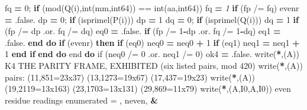 \documentclass[10pt]{article}
\renewcommand{\_}{\origunderscore\allowbreak}
\newenvironment{Shaded}{}{}
\newcommand{\BuiltInTok}[1]{#1}
\newcommand{\CommentTok}[1]{\textit{#1}}
\newcommand{\ConstantTok}[1]{#1}
\newcommand{\DecValTok}[1]{#1}
\newcommand{\KeywordTok}[1]{\textbf{#1}}
\newcommand{\NormalTok}[1]{#1}
\newcommand{\OperatorTok}[1]{#1}
\newcommand{\StringTok}[1]{#1}
\begin{document}
\begin{Shaded}
\begin{Highlighting}[]
\NormalTok{              fq }\KeywordTok{=} \DecValTok{0}\NormalTok{; }\KeywordTok{if}\NormalTok{ (}\BuiltInTok{mod}\NormalTok{(Q(i),}\BuiltInTok{int}\NormalTok{(mm,int64)) }\OperatorTok{==} \BuiltInTok{int}\NormalTok{(aa,int64)) fq }\KeywordTok{=}\CommentTok{ 1}
              \KeywordTok{if}\NormalTok{ (fp }\OperatorTok{/=}\NormalTok{ fq) even\_r }\KeywordTok{=} \ConstantTok{.false.}
\NormalTok{              dp }\KeywordTok{=} \DecValTok{0}\NormalTok{; }\KeywordTok{if}\NormalTok{ (isprime\_l(P(i))) dp }\KeywordTok{=} \DecValTok{1}
\NormalTok{              dq }\KeywordTok{=} \DecValTok{0}\NormalTok{; }\KeywordTok{if}\NormalTok{ (isprime\_l(Q(i))) dq }\KeywordTok{=} \DecValTok{1}
              \KeywordTok{if}\NormalTok{ (fp }\OperatorTok{/=}\NormalTok{ dp }\OperatorTok{.or.}\NormalTok{ fq }\OperatorTok{/=}\NormalTok{ dq) eq0 }\KeywordTok{=} \ConstantTok{.false.}
              \KeywordTok{if}\NormalTok{ (fp }\OperatorTok{/=} \DecValTok{1}\KeywordTok{{-}}\NormalTok{dp }\OperatorTok{.or.}\NormalTok{ fq }\OperatorTok{/=} \DecValTok{1}\KeywordTok{{-}}\NormalTok{dq) eq1 }\KeywordTok{=} \ConstantTok{.false.}
           \KeywordTok{end do}
           \KeywordTok{if}\NormalTok{ (even\_r) }\KeywordTok{then}
              \KeywordTok{if}\NormalTok{ (eq0) n\_eq0 }\KeywordTok{=}\NormalTok{ n\_eq0 }\KeywordTok{+} \DecValTok{1}
              \KeywordTok{if}\NormalTok{ (eq1) n\_eq1 }\KeywordTok{=}\NormalTok{ n\_eq1 }\KeywordTok{+} \DecValTok{1}
           \KeywordTok{end if}
        \KeywordTok{end do}
\BuiltInTok{     e}\NormalTok{nd }\KeywordTok{do}
\BuiltInTok{     i}\NormalTok{f (n\_eq0 }\OperatorTok{/=} \DecValTok{0} \OperatorTok{.or.}\NormalTok{ n\_eq1 }\OperatorTok{/=} \DecValTok{0}\NormalTok{) ok4 }\KeywordTok{=} \ConstantTok{.false.}
\BuiltInTok{     w}\NormalTok{rite(}\KeywordTok{*}\NormalTok{,}\StringTok{\textquotesingle{}(A)\textquotesingle{}}\NormalTok{) }\StringTok{\textquotesingle{}K4 THE PARITY FRAME, EXHIBITED (six listed pairs, mod 420)\textquotesingle{}}
\BuiltInTok{     w}\NormalTok{rite(}\KeywordTok{*}\NormalTok{,}\StringTok{\textquotesingle{}(A)\textquotesingle{}}\NormalTok{) }\StringTok{\textquotesingle{}  pairs: (11,851=23x37) (13,1273=19x67) (17,437=19x23)\textquotesingle{}}
\BuiltInTok{     w}\NormalTok{rite(}\KeywordTok{*}\NormalTok{,}\StringTok{\textquotesingle{}(A)\textquotesingle{}}\NormalTok{) }\StringTok{\textquotesingle{}         (19,2119=13x163) (23,1703=13x131) (29,869=11x79)\textquotesingle{}}
\BuiltInTok{     w}\NormalTok{rite(}\KeywordTok{*}\NormalTok{,}\StringTok{\textquotesingle{}(A,I0,A,I0)\textquotesingle{}}\NormalTok{) }\StringTok{\textquotesingle{}  even residue readings enumerated = \textquotesingle{}}\NormalTok{, n\_even, }\KeywordTok{\&}

\end{Highlighting}
\end{Shaded}
\end{document}
